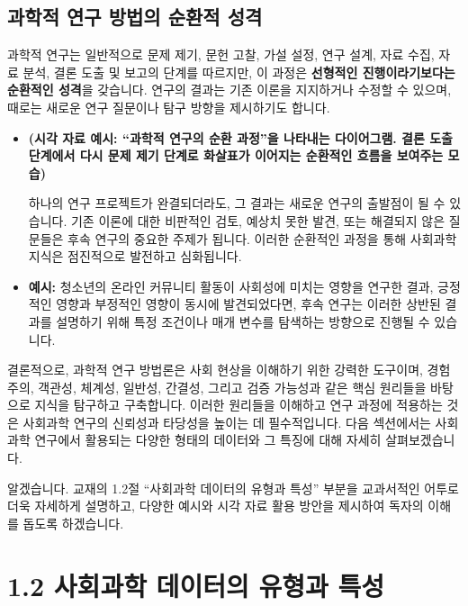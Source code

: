 \documentclass[
  letterpaper,
]{book}
\begin{document}
\subsection{과학적 연구 방법의 순환적
성격}\label{uxacfcuxd559uxc801-uxc5f0uxad6c-uxbc29uxbc95uxc758-uxc21cuxd658uxc801-uxc131uxaca9}

과학적 연구는 일반적으로 문제 제기, 문헌 고찰, 가설 설정, 연구 설계,
자료 수집, 자료 분석, 결론 도출 및 보고의 단계를 따르지만, 이 과정은
\textbf{선형적인 진행이라기보다는 순환적인 성격}을 갖습니다. 연구의
결과는 기존 이론을 지지하거나 수정할 수 있으며, 때로는 새로운 연구
질문이나 탐구 방향을 제시하기도 합니다.

\begin{itemize}
\item
  \textbf{(시각 자료 예시: ``과학적 연구의 순환 과정''을 나타내는
  다이어그램. 결론 도출 단계에서 다시 문제 제기 단계로 화살표가 이어지는
  순환적인 흐름을 보여주는 모습)}

  하나의 연구 프로젝트가 완결되더라도, 그 결과는 새로운 연구의 출발점이
  될 수 있습니다. 기존 이론에 대한 비판적인 검토, 예상치 못한 발견, 또는
  해결되지 않은 질문들은 후속 연구의 중요한 주제가 됩니다. 이러한
  순환적인 과정을 통해 사회과학 지식은 점진적으로 발전하고 심화됩니다.
\item
  \textbf{예시:} 청소년의 온라인 커뮤니티 활동이 사회성에 미치는 영향을
  연구한 결과, 긍정적인 영향과 부정적인 영향이 동시에 발견되었다면, 후속
  연구는 이러한 상반된 결과를 설명하기 위해 특정 조건이나 매개 변수를
  탐색하는 방향으로 진행될 수 있습니다.
\end{itemize}

결론적으로, 과학적 연구 방법론은 사회 현상을 이해하기 위한 강력한
도구이며, 경험주의, 객관성, 체계성, 일반성, 간결성, 그리고 검증 가능성과
같은 핵심 원리들을 바탕으로 지식을 탐구하고 구축합니다. 이러한 원리들을
이해하고 연구 과정에 적용하는 것은 사회과학 연구의 신뢰성과 타당성을
높이는 데 필수적입니다. 다음 섹션에서는 사회과학 연구에서 활용되는
다양한 형태의 데이터와 그 특징에 대해 자세히 살펴보겠습니다.

알겠습니다. 교재의 1.2절 ``사회과학 데이터의 유형과 특성'' 부분을
교과서적인 어투로 더욱 자세하게 설명하고, 다양한 예시와 시각 자료 활용
방안을 제시하여 독자의 이해를 돕도록 하겠습니다.

\section{1.2 사회과학 데이터의 유형과
특성}\label{uxc0acuxd68cuxacfcuxd559-uxb370uxc774uxd130uxc758-uxc720uxd615uxacfc-uxd2b9uxc131}
\end{document}
